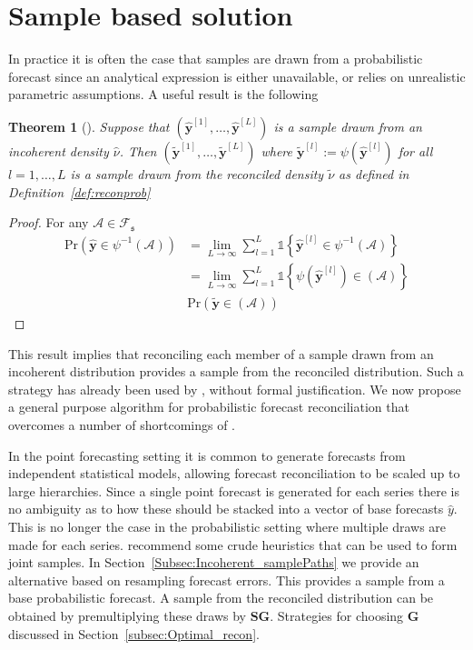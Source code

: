 \documentclass[12pt]{article}
\newtheorem{theo}{Theorem}[section]
\theoremstyle{definition}
\begin{document}
\section{Sample based solution}\label{sec:non-para}

In practice it is often the case that samples are drawn from a probabilistic forecast since an analytical expression is either unavailable, or relies on unrealistic parametric assumptions.  A useful result is the following
\begin{theo}[]
	Suppose that $\left(\hat{\bm y}^{[1]},\ldots,\hat{\bm y}^{[L]}\right)$ is a sample drawn from an incoherent density $\hat{\nu}$.  Then $\left(\tilde{\bm y}^{[1]},\ldots,\tilde{\bm y}^{[L]}\right)$ where $\tilde{\bm y}^{[l]}:=\psi(\hat{\bm y}^{[l]})$ for all $l=1,\ldots,L$ is a sample drawn from the reconciled density $\tilde{\nu}$ as defined in Definition~\ref{def:reconprob}
\end{theo}
\begin{proof}
	For any $\mathcal{A}\in\mathscr{F}_{\mathfrak{s}}$
\begin{align}
	\mbox{Pr}(\hat{{\bm y}}\in\psi^{-1}(\mathcal{A}))&=\underset{L\rightarrow\infty}{\lim}\sum\limits_{l=1}^L\mathbb{1}\left\{\hat{\bm y}^{[l]}\in\psi^{-1}(\mathcal{A})\right\}\nonumber\\
	&=\underset{L\rightarrow\infty}{\lim}\sum\limits_{l=1}^L\mathbb{1}\left\{\psi(\hat{\bm y}^{[l]})\in(\mathcal{A})\right\}\nonumber\\
	&\mbox{Pr}(\tilde{{\bm y}}\in(\mathcal{A}))\nonumber
\end{align}
\end{proof}

This result implies that reconciling each member of a sample drawn from an incoherent distribution provides a sample from the reconciled distribution.  Such a strategy has already been used by \cite{JeoEtAl2019}, without formal justification.  We now propose a general purpose algorithm for probabilistic forecast reconciliation that overcomes a number of shortcomings of \cite{JeoEtAl2019}.

In the point forecasting setting it is common to generate forecasts from independent statistical models, allowing forecast reconciliation to be scaled up to large hierarchies.  Since a single point forecast is generated for each series there is no ambiguity as to how these should be stacked into a vector of base forecasts $\hat{y}$.  This is no longer the case in the probabilistic setting where multiple draws are made for each series.  \cite{JeoEtAl2019} recommend some crude heuristics that can be used to form joint samples.  In Section~\ref{Subsec:Incoherent_samplePaths} we provide an alternative based on resampling forecast errors. This provides a sample from a base probabilistic forecast. A sample from the reconciled distribution can be obtained by premultiplying these draws by $\bm{S}\bm{G}$. Strategies for choosing $\bm{G}$ discussed in Section~\ref{subsec:Optimal_recon}. 
\end{document}
